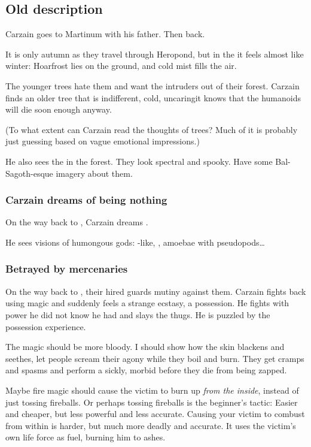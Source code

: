 \subsection{Old description}
Carzain goes to Martinum with his father. Then back.

It is only autumn as they travel through Heropond, but in the \Wylde it feels almost like winter: Hoarfrost lies on the ground, and cold mist fills the air.

The younger trees hate them and want the intruders out of their forest. Carzain finds an older tree that is indifferent, cold, uncaring\dash it knows that the humanoids will die soon enough anyway. 

(To what extent can Carzain read the thoughts of trees? Much of it is probably just guessing based on vague emotional impressions.)

He also sees the  in the forest. They look spectral and spooky. Have some Bal-Sagoth-esque imagery about them.






\subsubsection{Carzain dreams of being nothing}
On the way back to , Carzain dreams . 

He sees visions of humongous gods: 
\Human-like, \dragons, amoebae with pseudopods\ldots{}





\subsubsection{Betrayed by mercenaries}
On the way back to , their hired guards mutiny against them. Carzain fights back using magic and suddenly feels a strange ecstasy, a possession. He fights with power he did not know he had and slays the thugs. He is puzzled by the possession experience. 

The magic should be more bloody. I should show how the skin blackens and seethes, let people scream their agony while they boil and burn. They get cramps and spasms and perform a sickly, morbid  before they die from being zapped. 

Maybe fire magic should cause the victim to burn up \emph{from the inside}, instead of just tossing fireballs. Or perhaps tossing fireballs is the beginner's tactic: Easier and cheaper, but less powerful and less accurate. Causing your victim to combust from within is harder, but much more deadly and accurate. It uses the victim's own life force as fuel, burning him to ashes. 

